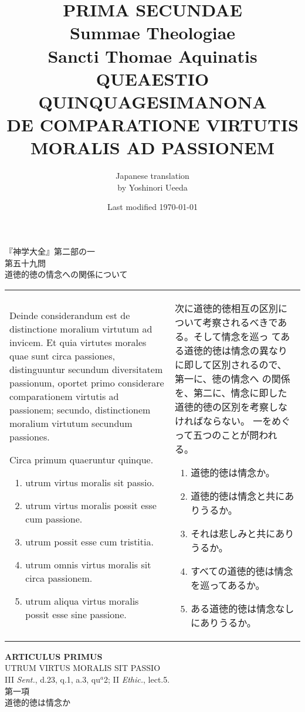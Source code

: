 \documentclass[10pt]{jsarticle}
\title{{\bf PRIMA SECUNDAE}\\{\HUGE Summae Theologiae}\\Sancti Thomae
Aquinatis\\{\sffamily QUEAESTIO QUINQUAGESIMANONA}\\DE COMPARATIONE VIRTUTIS MORALIS AD PASSIONEM}
\author{Japanese translation\\by Yoshinori {\sc Ueeda}}
\date{Last modified \today}
\begin{document}
\maketitle
\thispagestyle{empty}

\begin{center}
{\LARGE 『神学大全』第二部の一}\\
{\Large 第五十九問\\道徳的徳の情念への関係について}
\end{center}

\begin{longtable}{p{21em}p{21em}}
 Deinde considerandum est de distinctione moralium virtutum ad
 invicem. Et quia virtutes morales quae sunt circa passiones,
 distinguuntur secundum diversitatem passionum, oportet primo
 considerare comparationem virtutis ad passionem; secundo,
 distinctionem moralium virtutum secundum passiones.


 Circa primum quaeruntur quinque. 
  
\begin{enumerate}
 \item utrum virtus moralis sit passio.
 \item utrum virtus moralis possit esse cum passione.
 \item utrum possit esse cum tristitia.
 \item utrum omnis virtus moralis sit circa passionem.
 \item utrum aliqua virtus moralis possit esse sine passione.
\end{enumerate}

&

 次に道徳的徳相互の区別について考察されるべきである。そして情念を巡っ
てある道徳的徳は情念の異なりに即して区別されるので、第一に、徳の情念へ
の関係を、第二に、情念に即した道徳的徳の区別を考察しなければならない。
一をめぐって五つのことが問われる。

\begin{enumerate}
 \item 道徳的徳は情念か。
 \item 道徳的徳は情念と共にありうるか。
 \item それは悲しみと共にありうるか。
 \item すべての道徳的徳は情念を巡ってあるか。
 \item ある道徳的徳は情念なしにありうるか。
\end{enumerate}
\end{longtable}
\newpage
{}
\begin{center}
{\Large {\bf ARTICULUS PRIMUS}}\\
{\large UTRUM VIRTUS MORALIS SIT PASSIO}\\
{\footnotesize III {\itshape Sent.}, d.23, q.1, a.3, qu$^{a}$2; II {\itshape Ethic.}, lect.5.}\\
{\Large 第一項\\道徳的徳は情念か}
\end{center}
\end{document}
